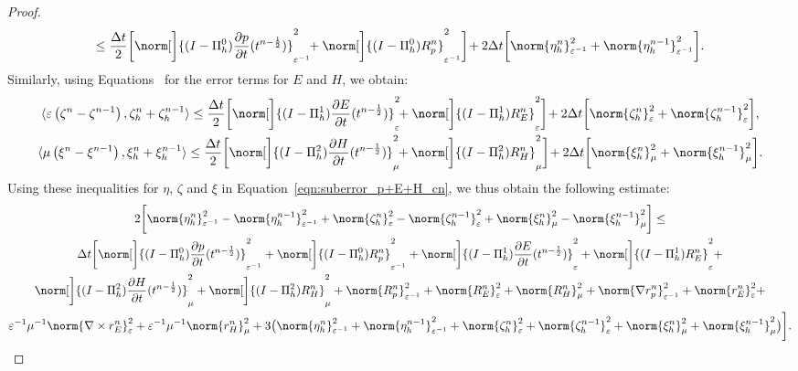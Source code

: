 \documentclass{amsart}
\theoremstyle{thmstyleone}%
\theoremstyle{thmstyletwo}%
\theoremstyle{thmstylethree}%
\newcommand{\ainnerproduct}[2]{\langle #1, #2 \rangle}
\begin{document}
\begin{proof}
\begin{multline*}
  \le \dfrac{\Delta t}{2} \bigg[ \norm[\bigg]{(I - \Pi_h^0) \dfrac{\partial p}{\partial t}(t^{n - \frac{1}{2}})}^2_{\varepsilon^{-1}} \!\! + \norm[\bigg]{(I - \Pi_h^0) R_p^n}^2_{\varepsilon^{-1}} \bigg] \! + 2 \Delta t \bigg[ \norm{\eta_h^n}^2_{\varepsilon^{-1}} + \norm{\eta_h^{n - 1}}^2_{\varepsilon^{-1}} \bigg].
\end{multline*}
Similarly, using Equations~ for the error terms for $E$ and $H$, we obtain:
\begin{gather*}
  \ainnerproduct{\varepsilon \left( \zeta^n - \zeta^{n - 1} \right)}{\zeta^n_h + \zeta^{n - 1}_h} \le \dfrac{\Delta t }{2} \bigg[ \norm[\bigg]{(I - \Pi_h^1) \dfrac{\partial E}{\partial t}(t^{n - \frac{1}{2}})}^2_{\varepsilon} \!\! + \norm[\bigg]{(I - \Pi_h^1) R_E^n}^2_{\varepsilon} \bigg] \! + 2 \Delta t \bigg[ \norm{\zeta_h^n}^2_{\varepsilon} + \norm{\zeta_h^{n - 1}}^2_{\varepsilon} \bigg], \\ 
\ainnerproduct{\mu \left( \xi^n - \xi^{n - 1} \right)}{\xi^n_h + \xi^{n - 1}_h} \le \dfrac{\Delta t }{2} \bigg[ \norm[\bigg]{(I - \Pi_h^2) \dfrac{\partial H}{\partial t}(t^{n - \frac{1}{2}})}^2_\mu \!\!  + \norm[\bigg]{(I - \Pi_h^2) R_H^n}^2_{\mu} \bigg] \! + 2 \Delta t \bigg[ \norm{\xi_h^n}^2_{\mu} + \norm{\xi_h^{n - 1}}^2_{\mu} \bigg].
\end{gather*}
Using these inequalities for $\eta$, $\zeta$ and $\xi$ in Equation~\eqref{eqn:suberror_p+E+H_cn}, we thus obtain the following estimate:
\begin{multline*}
2 \bigg[ \norm{\eta_h^n}^2_{\varepsilon^{-1}} - \norm{\eta_h^{n - 1}}^2_{\varepsilon^{-1}} + \norm{\zeta_h^n}^2_{\varepsilon} - \norm{\zeta_h^{n - 1}}^2_{\varepsilon} + \norm{\xi_h^n}^2_{\mu} - \norm{\xi_h^{n - 1}}^2_{\mu} \bigg] \le \\
\Delta t \bigg[ \norm[\bigg]{(I - \Pi_h^0) \dfrac{\partial p}{\partial t}(t^{n - \frac{1}{2}})}^2_{\varepsilon^{-1}} + \norm[\bigg]{(I - \Pi_h^0) R_p^n}^2_{\varepsilon^{-1}} + \norm[\bigg]{(I - \Pi_h^1) \dfrac{\partial E}{\partial t}(t^{n - \frac{1}{2}})}^2_{\varepsilon}  + \norm[\bigg]{(I - \Pi_h^1) R_E^n}^2_{\varepsilon} + \\
  \norm[\bigg]{(I - \Pi_h^2) \dfrac{\partial H}{\partial t}(t^{n-\frac{1}{2}})}^2_\mu + \norm[\bigg]{(I - \Pi_h^2) R_H^n}^2_\mu + \norm{R_p^n}^2_{\varepsilon^{-1}} + \norm{R_E^n}^2_{\varepsilon} + \norm{R_H^n}^2_\mu + \norm{\nabla r_p^n} ^2_{\varepsilon^{-1}} + \norm{r_E^n}^2_{\varepsilon} + \\
 \varepsilon^{-1} \mu^{-1} \norm{\nabla \times r_E^n}^2_{\varepsilon} +  \varepsilon^{-1} \mu^{-1} \norm{r_H^n}^2_{\mu} + 3 \big( \norm{\eta_h^n}^2_{\varepsilon^{-1}} + \norm{\eta_h^{n - 1}}^2_{\varepsilon^{-1}} + \norm{\zeta_h^n}^2_{\varepsilon} + \norm{\zeta_h^{n - 1}}^2_{\varepsilon} + \norm{\xi_h^n}^2_\mu + \norm{\xi_h^{n - 1}}^2_\mu \big) \bigg].

\end{multline*}
\end{proof}
\end{document}

